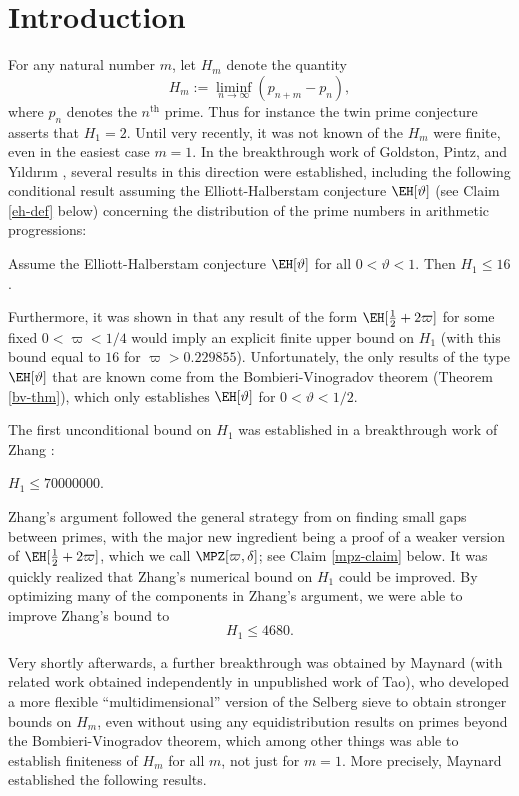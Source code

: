 
\section{Introduction}

For any natural number $m$, let $H_m$ denote the quantity
$$ H_m := \liminf_{n \to \infty} (p_{n+m} - p_n),$$
where $p_n$ denotes the $n^{\operatorname{th}}$ prime.  Thus for instance the twin prime conjecture asserts that $H_1=2$.  Until very recently, it was not known of the $H_m$ were finite, even in the easiest case $m=1$.  In the breakthrough work of Goldston, Pintz, and Y{\i}ld{\i}r{\i}m \cite{gpy}, several results in this direction were established, including the following conditional result assuming the Elliott-Halberstam conjecture $\EH[\vartheta]$ (see Claim \ref{eh-def} below) concerning the distribution of the prime numbers in arithmetic progressions:

\begin{theorem}\label{gpy-thm}  Assume the Elliott-Halberstam conjecture $\EH[\vartheta]$ for all $0 < \vartheta < 1$.  Then $H_1 \leq 16$.
\end{theorem}

Furthermore, it was shown in \cite{gpy} that any result of the form $\EH[\frac{1}{2} + 2\varpi]$ for some fixed $0 < \varpi < 1/4$ would imply an explicit finite upper bound on $H_1$ (with this bound equal to $16$ for $\varpi > 0.229855$).  Unfortunately, the only results of the type $\EH[\vartheta]$ that are known come from the Bombieri-Vinogradov theorem (Theorem \ref{bv-thm}), which only establishes $\EH[\vartheta]$ for $0 < \vartheta < 1/2$.

The first unconditional bound on $H_1$ was established  in a breakthrough work of Zhang \cite{zhang}:

\begin{theorem}  $H_1 \leq \num{70000000}$.
\end{theorem}

Zhang's argument followed the general strategy from \cite{gpy} on finding small gaps between primes, with the major new ingredient being a proof of a weaker version of $\EH[\frac{1}{2}+2\varpi]$, which we call $\MPZ[\varpi,\delta]$; see Claim \ref{mpz-claim} below.  It was quickly realized that Zhang's numerical bound on $H_1$ could be improved.  By optimizing many of the components in Zhang's argument, we were able \cite{polymath8a} to improve Zhang's bound to
$$ H_1 \leq \num{4680}.$$

Very shortly afterwards, a further breakthrough was obtained by Maynard \cite{maynard-new} (with related work obtained independently in unpublished work of Tao), who developed a more flexible ``multidimensional'' version of the Selberg sieve to obtain stronger bounds on $H_m$, even without using any equidistribution results on primes beyond the Bombieri-Vinogradov theorem, which among other things was able to establish finiteness of $H_m$ for all $m$, not just for $m=1$.  More precisely, Maynard established the following results.

